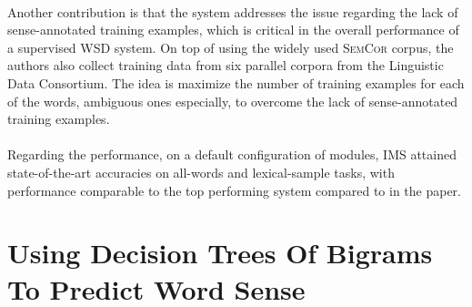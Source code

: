 \paragraph{}
Another contribution is that the system addresses the issue regarding the lack of sense-annotated training examples, which is critical in the overall performance of a supervised WSD system. On top of using the widely used \textsc{SemCor} corpus, the authors also collect training data from six parallel corpora from the Linguistic Data Consortium. The idea is maximize the number of training examples for each of the words, ambiguous ones especially, to overcome the lack of sense-annotated training examples.

\paragraph{}
Regarding the performance, on a default configuration of modules, IMS attained state-of-the-art accuracies on all-words and lexical-sample tasks, with performance comparable to the top performing system compared to in the paper.

\section{Using Decision Trees Of Bigrams To Predict Word Sense}
